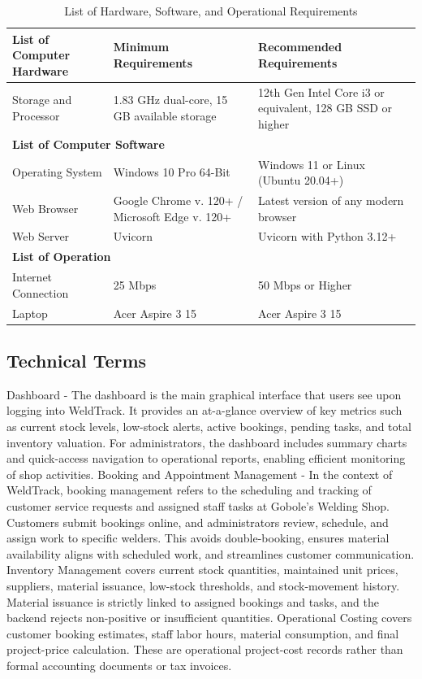 \documentclass[12pt, letterpaper]{article}
\begin{document}
\begin{table}[h]
\centering
\caption{List of Hardware, Software, and Operational Requirements}
\begin{tabular}{p{5cm} p{4cm} p{5cm}}
\hline
\textbf{List of Computer Hardware} & \textbf{Minimum Requirements} & \textbf{Recommended Requirements} \\
\hline
Storage and Processor & 1.83 GHz dual-core, 15 GB available storage & 12th Gen Intel Core i3 or equivalent, 128 GB SSD or higher \\
\hline
\multicolumn{3}{l}{\textbf{List of Computer Software}} \\
\hline
Operating System & Windows 10 Pro 64-Bit & Windows 11 or Linux (Ubuntu 20.04+) \\
Web Browser & Google Chrome v. 120+ / Microsoft Edge v. 120+ & Latest version of any modern browser \\
Web Server & Uvicorn & Uvicorn with Python 3.12+ \\
\hline
\multicolumn{3}{l}{\textbf{List of Operation}} \\
\hline
Internet Connection & 25 Mbps & 50 Mbps or Higher \\
Laptop & Acer Aspire 3 15 & Acer Aspire 3 15 \\
\hline
\end{tabular}
\end{table}

 \subsection*{Technical Terms}
\hspace*{2em} Dashboard - The dashboard is the main graphical interface that users see upon logging into WeldTrack. It provides an at-a-glance overview of key metrics such as current stock levels, low-stock alerts, active bookings, pending tasks, and total inventory valuation. For administrators, the dashboard includes summary charts and quick-access navigation to operational reports, enabling efficient monitoring of shop activities.
\hspace*{2em} Booking and Appointment Management - In the context of WeldTrack, booking management refers to the scheduling and tracking of customer service requests and assigned staff tasks at Gobole's Welding Shop. Customers submit bookings online, and administrators review, schedule, and assign work to specific welders. This avoids double-booking, ensures material availability aligns with scheduled work, and streamlines customer communication.
\hspace*{2em} Inventory Management covers current stock quantities, maintained unit prices, suppliers, material issuance, low-stock thresholds, and stock-movement history. Material issuance is strictly linked to assigned bookings and tasks, and the backend rejects non-positive or insufficient quantities.
\hspace*{2em} Operational Costing covers customer booking estimates, staff labor hours, material consumption, and final project-price calculation. These are operational project-cost records rather than formal accounting documents or tax invoices.
\end{document}
